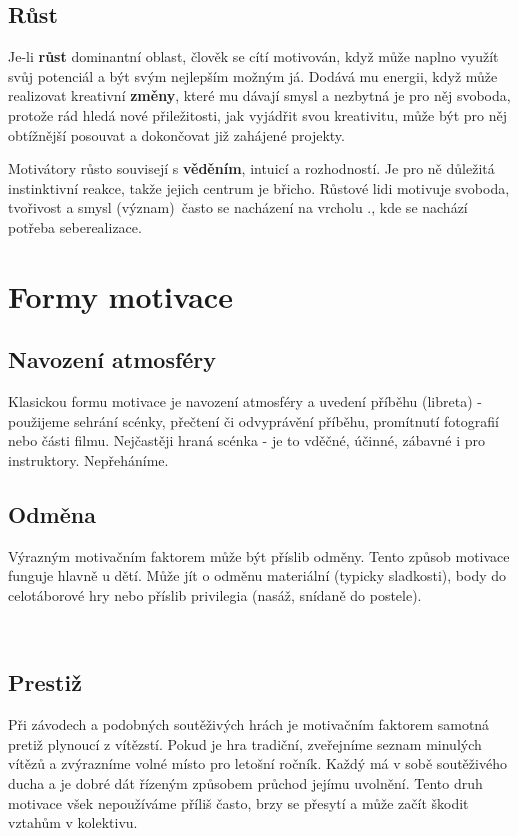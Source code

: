 \documentclass[a4paper,12pt]{report}
\begin{document}
\subsection[Růst]{Růst}

Je-li \textbf{růst} dominantní oblast, člověk se cítí motivován, když může naplno využít svůj potenciál a být svým nejlepším možným já. Dodává mu energii, když může realizovat kreativní \textbf{změny}, které mu dávají smysl a nezbytná je pro něj svoboda, protože rád hledá nové přiležitosti, jak vyjádřit svou kreativitu, může být pro něj obtížnější posouvat a dokončovat již zahájené projekty.

Motivátory růsto souvisejí s \textbf{věděním}, intuicí a rozhodností. Je pro ně důležitá instinktivní reakce, takže jejich centrum je břicho. Růstové lidi motivuje svoboda, tvořivost a smysl (význam)\ často se nacházení na vrcholu ., kde se nachází potřeba seberealizace.


\section[Formy motivace]{Formy motivace}

\subsection*{Navození atmosféry}
Klasickou formu motivace je navození atmosféry a uvedení příběhu (libreta)  - použijeme sehrání scénky, přečtení či odvyprávění příběhu, promítnutí fotografií nebo části filmu. Nejčastěji hraná scénka - je to vděčné, účinné, zábavné i pro instruktory. Nepřeháníme.

\subsection*{Odměna}
Výrazným motivačním faktorem může být příslib odměny. Tento způsob motivace funguje hlavně u dětí. Může jít o odměnu materiální (typicky sladkosti), body do celotáborové hry nebo příslib privilegia (nasáž, snídaně do postele).

\

\subsection*{Prestiž}
Při závodech a podobných soutěživých hrách je motivačním faktorem samotná pretiž plynoucí z vítězstí. Pokud je hra tradiční, zveřejníme seznam minulých vítězů a zvýrazníme volné místo pro letošní ročník. Každý má v sobě soutěživého ducha a je dobré dát řízeným způsobem průchod jejímu uvolnění. Tento druh motivace všek nepoužíváme příliš často, brzy se přesytí a může začít škodit vztahům v kolektivu.
\end{document}
